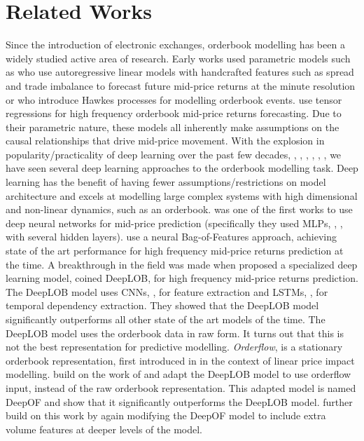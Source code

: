 \section{Related Works}
Since the introduction of electronic exchanges, orderbook modelling has been a widely studied active area of research.
Early works used parametric models such as \cite{CAO2009} who use autoregressive linear models with handcrafted features such as spread and trade imbalance
to forecast future mid-price returns at the minute resolution or \cite{HAWKES2013} who introduce Hawkes processes for modelling orderbook events. \cite{DAT2017} use
tensor regressions for high frequency orderbook mid-price returns forecasting. Due to their parametric nature, these models all inherently make
assumptions on the causal relationships that drive mid-price movement. With the explosion in popularity/practicality
of deep learning over the past few decades, \cite{RUMELHART1986}, \cite{LECUN1989}, \cite{HOCHREITER1997}, \cite{LECUN1998},  \cite{ALEX2012}, \cite{VASWANI2017},
we have seen several deep learning approaches to the orderbook modelling task. Deep learning has the benefit of having fewer assumptions/restrictions
on model architecture and excels at modelling large complex systems with high dimensional and non-linear dynamics, such as an orderbook.
\cite{DIXON2017} was one of the first works to use deep neural networks for mid-price prediction (specifically they used MLPs, \cite{ROSENBLATT1958}, \cite{HORNIK1989}, with several hidden layers).
\cite{PASSALIS2020} use a neural Bag-of-Features approach, achieving state of the art performance for high frequency mid-price returns prediction at the time.
A breakthrough in the field was made when \cite{ZHANG2019} proposed a specialized deep learning model, coined DeepLOB, for high frequency mid-price returns prediction.
The DeepLOB model uses CNNs, \cite{LECUN1998}, for feature extraction and LSTMs, \cite{HOCHREITER1997}, for temporal dependency extraction.
They showed that the DeepLOB model significantly outperforms all other state of the art models of the time. The DeepLOB model
uses the orderbook data in raw form. It turns out that this is not the best representation for predictive modelling. 
\textit{Orderflow}, is a stationary orderbook representation, first introduced in \cite{CONT2013} in the context of linear price impact modelling.
\cite{KOLM2023} build on the work of \cite{ZHANG2019} and adapt the DeepLOB model to use orderflow input, instead of the raw orderbook representation.
This adapted model is named DeepOF and \cite{KOLM2023} show that it significantly outperforms the DeepLOB model. \cite{LUCCHESE2024} further
build on this work by again modifying the DeepOF model to include extra volume features at deeper levels of the model.

